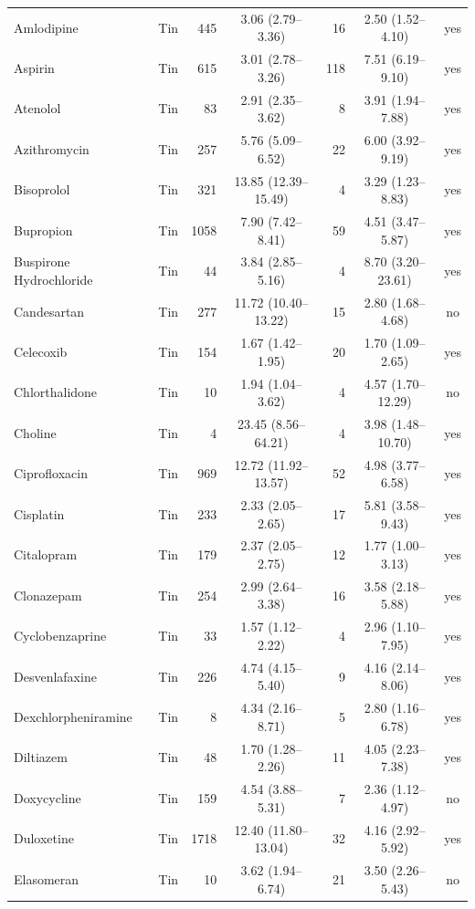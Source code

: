 \documentclass[10pt]{article}
\begin{document}
{\begin{longtable}{lcrcrcc}
Amlodipine & Tin & 445 & 3.06 (2.79--3.36) & 16 & 2.50 (1.52--4.10) & yes \\
Aspirin & Tin & 615 & 3.01 (2.78--3.26) & 118 & 7.51 (6.19--9.10) & yes \\
Atenolol & Tin & 83 & 2.91 (2.35--3.62) & 8 & 3.91 (1.94--7.88) & yes \\
Azithromycin & Tin & 257 & 5.76 (5.09--6.52) & 22 & 6.00 (3.92--9.19) & yes \\
Bisoprolol & Tin & 321 & 13.85 (12.39--15.49) & 4 & 3.29 (1.23--8.83) & yes \\
Bupropion & Tin & 1058 & 7.90 (7.42--8.41) & 59 & 4.51 (3.47--5.87) & yes \\
Buspirone Hydrochloride & Tin & 44 & 3.84 (2.85--5.16) & 4 & 8.70 (3.20--23.61) & yes \\
Candesartan & Tin & 277 & 11.72 (10.40--13.22) & 15 & 2.80 (1.68--4.68) & no \\
Celecoxib & Tin & 154 & 1.67 (1.42--1.95) & 20 & 1.70 (1.09--2.65) & yes \\
Chlorthalidone & Tin & 10 & 1.94 (1.04--3.62) & 4 & 4.57 (1.70--12.29) & no \\
Choline & Tin & 4 & 23.45 (8.56--64.21) & 4 & 3.98 (1.48--10.70) & yes \\
Ciprofloxacin & Tin & 969 & 12.72 (11.92--13.57) & 52 & 4.98 (3.77--6.58) & yes \\
Cisplatin & Tin & 233 & 2.33 (2.05--2.65) & 17 & 5.81 (3.58--9.43) & yes \\
Citalopram & Tin & 179 & 2.37 (2.05--2.75) & 12 & 1.77 (1.00--3.13) & yes \\
Clonazepam & Tin & 254 & 2.99 (2.64--3.38) & 16 & 3.58 (2.18--5.88) & yes \\
Cyclobenzaprine & Tin & 33 & 1.57 (1.12--2.22) & 4 & 2.96 (1.10--7.95) & yes \\
Desvenlafaxine & Tin & 226 & 4.74 (4.15--5.40) & 9 & 4.16 (2.14--8.06) & yes \\
Dexchlorpheniramine & Tin & 8 & 4.34 (2.16--8.71) & 5 & 2.80 (1.16--6.78) & yes \\
Diltiazem & Tin & 48 & 1.70 (1.28--2.26) & 11 & 4.05 (2.23--7.38) & yes \\
Doxycycline & Tin & 159 & 4.54 (3.88--5.31) & 7 & 2.36 (1.12--4.97) & no \\
Duloxetine & Tin & 1718 & 12.40 (11.80--13.04) & 32 & 4.16 (2.92--5.92) & yes \\
Elasomeran & Tin & 10 & 3.62 (1.94--6.74) & 21 & 3.50 (2.26--5.43) & no \\

\end{longtable}}
\end{document}
